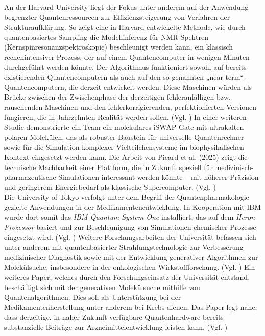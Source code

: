 An der Harvard University liegt der Fokus unter anderem auf der Anwendung begrenzter Quantenressourcen zur Effizienzsteigerung von Verfahren der Strukturaufklärung. So zeigt eine in Harvard entwickelte Methode, wie durch quantenbasiertes Sampling die Modellinferenz für NMR-Spektren (Kernspinresonanzspektroskopie) beschleunigt werden kann, ein klassisch rechenintensiver Prozess, der auf einem Quantencomputer in wenigen Minuten durchgeführt werden könnte. Der Algorithmus funktioniert sowohl auf bereits existierenden Quantencomputern als auch auf den so genannten „near-term“-Quantencomputern, die derzeit entwickelt werden. Diese Maschinen würden als Brücke zwischen der Zwischenphase der derzeitigen fehleranfälligen bzw. rauschenden Maschinen und den fehlerkorrigierenden, perfektionierten Versionen fungieren, die in Jahrzehnten Realität werden sollen. (Vgl. \cite{sels_quantum_2020})
In einer weiteren Studie demonstrierte ein Team ein molekulares iSWAP-Gate mit ultrakalten polaren Molekülen, das als robuster Baustein für universelle Quantenrechner sowie für die Simulation komplexer Vielteilchensysteme im biophysikalischen Kontext eingesetzt werden kann. Die Arbeit von Picard et al. (2025) zeigt die technische Machbarkeit einer Plattform, die in Zukunft speziell für medizinisch-pharmazeutische Simulationen interessant werden könnte – mit höherer Präzision und geringerem Energiebedarf als klassische Supercomputer. (Vgl. \cite{picard_entanglement_2025})\\

Die University of Tokyo verfolgt unter dem Begriff der Quantenpharmakologie gezielte Anwendungen in der Medikamentenentwicklung. In Kooperation mit IBM wurde dort somit das \textit{IBM Quantum System One} installiert, das auf dem \textit{Heron-Prozessor} basiert und zur Beschleunigung von Simulationen chemischer Prozesse eingesetzt wird. (Vgl. \cite{noauthor_utokyo_nodate}) Weitere Forschungsarbeiten der Universität befassen sich unter anderem mit quantenbasierter Strahlungstechnologie zur Verbesserung medizinischer Diagnostik sowie mit der Entwicklung generativer Algorithmen zur Molekülsuche, insbesondere in der onkologischen Wirkstoffforschung. (Vgl. \cite{shimazoe_development_2020})
Ein weiteres Paper, welches durch den Forschungseinsatz der Universität entstand, beschäftigt sich mit der generativen Molekülsuche mithilfe von Quantenalgorithmen. Dies soll als Unterstützung bei der Medikamentenherstellung unter anderem bei Krebs dienen. Das Paper legt nahe, dass derzeitige, in naher Zukunft verfügbare Quantenhardware bereits substanzielle Beiträge zur Arzneimittelentwicklung leisten kann. (Vgl. \cite{vakiliQuantumComputingEnhancedAlgorithm2024})

